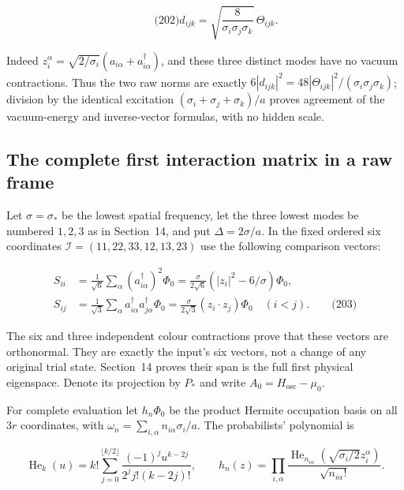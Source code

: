 \[
\qquad\text{(202)}
 d_{ijk}=\sqrt{\frac8{\sigma_i\sigma_j\sigma_k}}\,\Theta_{ijk}.
\]

Indeed
\(z_i^\alpha=\sqrt{2/\sigma_i}(a_{i\alpha}+a^\dagger_{i\alpha})\), and
these three distinct modes have no vacuum contractions. Thus the two raw
norms are exactly
\(6|d_{ijk}|^2=48|\Theta_{ijk}|^2/(\sigma_i\sigma_j\sigma_k)\); division
by the identical excitation \((\sigma_i+\sigma_j+\sigma_k)/a\) proves
agreement of the vacuum-energy and inverse-vector formulas, with no
hidden scale.

\subsection{The complete first interaction matrix in a raw
frame}\label{interacting-tensor-band-md-the-complete-first-interaction-matrix-in-a-raw-frame}

Let \(\sigma=\sigma_*\) be the lowest spatial frequency, let the three
lowest modes be numbered \(1,2,3\) as in Section~14, and put
\(\Delta=2\sigma/a\). In the fixed ordered six coordinates
\(\mathcal I=(11,22,33,12,13,23)\) use the following comparison vectors:

\[
\begin{aligned}
 S_{ii}&=\frac1{\sqrt6}\sum_\alpha
                  (a^\dagger_{i\alpha})^2\Phi_0
       =\frac{\sigma}{2\sqrt6}(|z_i|^2-6/\sigma)\Phi_0,\\
 S_{ij}&=\frac1{\sqrt3}\sum_\alpha
           a^\dagger_{i\alpha}a^\dagger_{j\alpha}\Phi_0
       =\frac{\sigma}{2\sqrt3}(z_i\cdot z_j)\Phi_0\quad(i<j).
 \qquad\text{(203)}
\end{aligned}
\]

The six and three independent colour contractions prove that these
vectors are orthonormal. They are exactly the input's six vectors, not a
change of any original trial state. Section~14 proves their span is the
full first physical eigenspace. Denote its projection by \(P_*\) and
write \(A_0=H_{\mathrm{osc}}-\mu_0\).

For complete evaluation let \(h_n\Phi_0\) be the product Hermite
occupation basis on all \(3r\) coordinates, with
\(\omega_n=\sum_{i,\alpha}n_{i\alpha}\sigma_i/a\). The probabilists'
polynomial is

\[
\operatorname{He}_k(u)=k!\sum_{j=0}^{\lfloor k/2\rfloor}
 \frac{(-1)^j u^{k-2j}}{2^j j!(k-2j)!},\qquad
 h_n(z)=\prod_{i,\alpha}
 \frac{\operatorname{He}_{n_{i\alpha}}(\sqrt{\sigma_i/2}z_i^\alpha)}
      {\sqrt{n_{i\alpha}!}}.
\]

